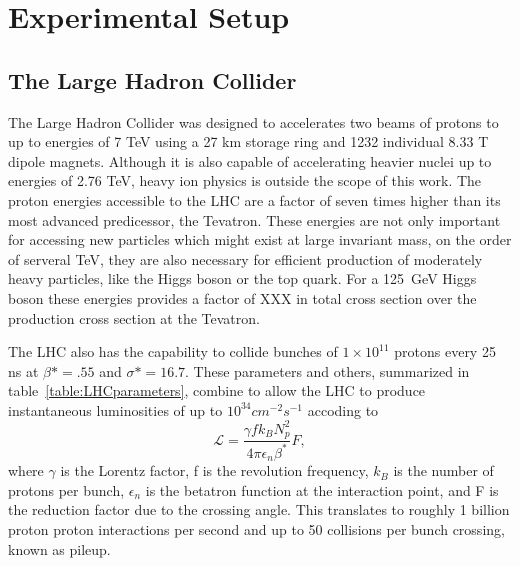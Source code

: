 \newcommand{\microns}{$\mu m$}


\chapter{Experimental Setup}
\label{sec:ExpSetup}


\section{The Large Hadron Collider}
\label{sec:LHC}
The Large Hadron Collider was designed to accelerates two beams of protons to up to 
energies of 7 TeV using a 27 km storage ring and  1232 individual 8.33 T dipole magnets. 
Although it is also capable of accelerating heavier nuclei up to energies of 
2.76 TeV, heavy ion physics is outside the scope of this work.  The proton
energies accessible to the LHC are a factor of seven times higher than its
most advanced predicessor, the Tevatron.  These energies are not only 
important for accessing new particles which might exist at large invariant
mass, on the order of serveral TeV, they are also necessary for efficient 
production of moderately heavy particles, like the Higgs boson or the top 
quark.  For a 125~GeV Higgs boson these energies provides a 
factor of XXX in total cross section over the production cross section at
the Tevatron.  

The LHC also has the capability to collide bunches of $1\times10^{11}$
protons every 25 ns at $\beta*=.55$ and $\sigma*=16.7$.  These
parameters and others, summarized in table~\ref{table:LHCparameters},
combine to allow the LHC to produce instantaneous luminosities 
of up to $10^{34} cm^{-2}s^{-1}$ accoding to
\begin{equation}
\mathscr{L} = \frac{\gamma f k_B N_p^2}{4\pi \epsilon_n\beta^*}F,
\end{equation}
where $\gamma$ is the Lorentz factor, f is the revolution frequency,
$k_B$ is the number of protons per bunch, $\epsilon_n$ is the betatron
function at the interaction point, and F is the reduction factor
due to the crossing angle.  This translates to roughly 1 billion proton
proton interactions per second and up to 50 collisions per bunch crossing, 
known as pileup.  

